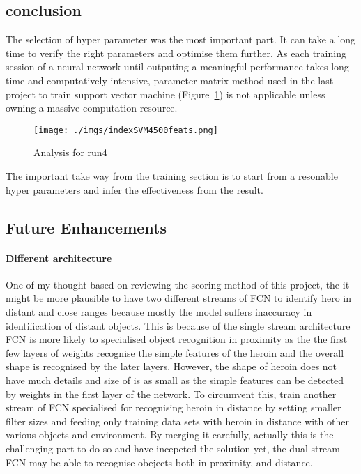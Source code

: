 \documentclass[paper=a4, fontsize=11pt]{scrartcl} %
\numberwithin{equation}{section} %
\numberwithin{figure}{section} %
\numberwithin{table}{section} %
\begin{document}
\begin{enumerate}
\begin{itemize}
{\subsection{conclusion}
The selection of hyper parameter was the most important part. It can take a long time to verify the right parameters and optimise them further. As each training session of a neural network until outputing a meaningful performance takes long time and computatively intensive, parameter matrix method used in the last project to train support vector machine (Figure~\ref{fig:svmTrainMatrix}) is not applicable unless owning a massive computation resource.
\begin{figure}	
	\texttt{[image: ./imgs/indexSVM4500feats.png]} 
	\caption{Analysis for run4}
	\label{fig:svmTrainMatrix}
 \end{figure}
The important take way from the training section is to start from a resonable hyper parameters and infer the effectiveness from the result.

\subsection{Future Enhancements}\label{rubric01}

\paragraph{Different architecture}
One of my thought based on reviewing the scoring method of this project, the it might be more plausible to have two different streams of FCN to identify hero in distant and close ranges because mostly the model suffers inaccuracy in identification of distant objects. This is because of the single stream architecture FCN is more likely to specialised object recognition in proximity as the the first few layers of weights recognise the simple features of the heroin and the overall shape is recognised by the later layers. However, the shape of heroin does not have much details and size of is as small as the simple features can be detected by weights in the first layer of the network. To circumvent this, train another stream of FCN specialised for recognising heroin in distance by setting smaller filter sizes and feeding only training data sets with heroin in distance with other various objects and environment. By merging it carefully, actually this is the challenging part to do so and have incepeted the solution yet, the dual stream FCN may be able to recognise obejects both in proximity, and distance.
}
\end{itemize}
\end{enumerate}
\end{document}
